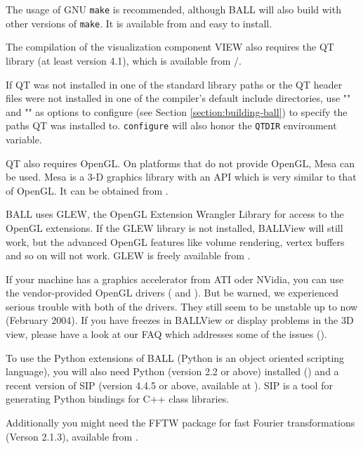 The usage of GNU {\tt make} is recommended, although BALL will also build with
other versions of {\tt make}. It is available from 
and easy to install.

The compilation of the visualization component VIEW also requires
the QT library (at least version 4.1), which is available from
/.

If QT was not installed in one of the standard library paths or the
QT header files were not installed in one of the compiler's default
include directories, use \mbox{""} and
\mbox{""} as options to configure (see
Section \ref{section:building-ball}) to specify the paths QT was installed
to. {\tt configure} will also honor the {\tt QTDIR} environment variable.

QT also requires OpenGL. On platforms that do not provide OpenGL, Mesa can
be used. Mesa is a 3-D graphics library with an API which is 
very similar to that of OpenGL. It can be obtained from 
.

BALL uses GLEW, the OpenGL Extension Wrangler Library for access to the OpenGL extensions.
If the GLEW library is not installed, BALLView will still work, but the advanced OpenGL features
like volume rendering, vertex buffers and so on will not work. GLEW is freely available from
.

If your machine has a graphics accelerator from ATI oder NVidia, 
you can use the vendor-provided OpenGL drivers (
and ).
But be warned, we experienced serious trouble with both of the drivers. They
still seem to be unstable up to now (February 2004). If you have freezes in
BALLView or display problems in the 3D view, please have a look at our FAQ
which addresses some of the issues
().

To use the Python extensions of BALL (Python is an object oriented
scripting language), you will also need Python (version 2.2 or above) installed
() and a recent version of SIP (version 4.4.5 or
above, available at ). SIP is a tool
for generating Python bindings for C++ class libraries.

Additionally you might need the FFTW package for fast Fourier
transformations (Verson 2.1.3), available from .

